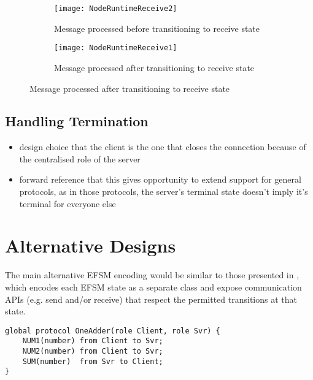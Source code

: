 \begin{figure}[!ht]
\centering
\begin{subfigure}[b]{0.8\textwidth}
\centering
\texttt{[image: NodeRuntimeReceive2]}
\caption{Message processed before transitioning to receive state}
\label{subfig:nodereceivemsgfirst}
\end{subfigure}
\hfill
\begin{subfigure}[b]{0.8\textwidth}
\centering
\texttt{[image: NodeRuntimeReceive1]}
\caption{Message processed after transitioning to receive state}
\label{subfig:nodereceivehandlefirst}
\end{subfigure}
\label{fig:nodereceivecompare}
\end{figure}

\subsection{Handling Termination}
\begin{itemize}
\item design choice that the client is the one that closes the connection because of the centralised role of the server
\item forward reference that this gives opportunity to extend support for general protocols, as in those protocols, the server's terminal state doesn't imply it's terminal for everyone else
\end{itemize}

\section{Alternative Designs}
\label{section:nodealt}

The main alternative EFSM encoding would be similar to those
presented in \cite{Hybrid2016}, which encodes
each EFSM state as a separate class and expose communication APIs
(e.g. send and/or receive) that respect the permitted transitions at
that state. 

\begin{lstlisting}[language=scribble]
global protocol OneAdder(role Client, role Svr) {
	NUM1(number) from Client to Svr;
	NUM2(number) from Client to Svr;
	SUM(number)  from Svr to Client;
}
\end{lstlisting}

